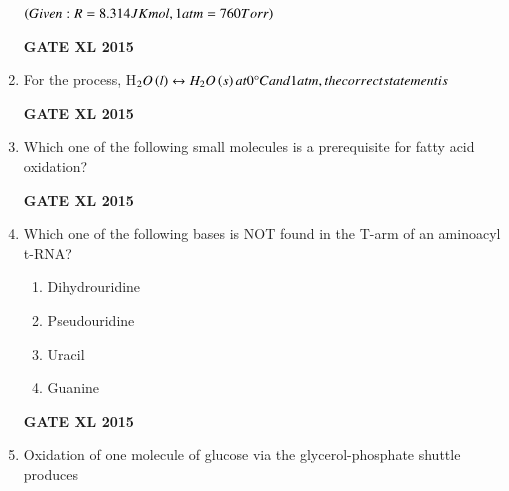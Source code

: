 \documentclass[journal,12pt,onecolumn]{IEEEtran}
\begin{document}
\begin{enumerate}
$\left(Given: R=8.314 JK mol, 1 atm = 760 Torr\right)$
\begin{flushright}\textbf{GATE XL 2015}\end{flushright}
\item For the process, H$_2O\left(l\right)\leftrightarrow H_2O\left(s\right) at 0\degree C and 1 atm, the correct statement is$
    \begin{enumerate}
    \end{enumerate}
\begin{flushright}\textbf{GATE XL 2015}\end{flushright}
\item Which one of the following small molecules is a prerequisite for fatty acid oxidation?
    \begin{enumerate}
    \end{enumerate}
\begin{flushright}\textbf{GATE XL 2015}\end{flushright}
\item Which one of the following bases is NOT found in the T-arm of an aminoacyl t-RNA?
    \begin{enumerate}
            \item Dihydrouridine
	    \item Pseudouridine
	    \item Uracil
            \item Guanine
    \end{enumerate}
\begin{flushright}\textbf{GATE XL 2015}\end{flushright}
\item Oxidation of one molecule of glucose via the glycerol-phosphate shuttle produces
    \begin{enumerate}

\end{enumerate}
\end{enumerate}
\end{document}
